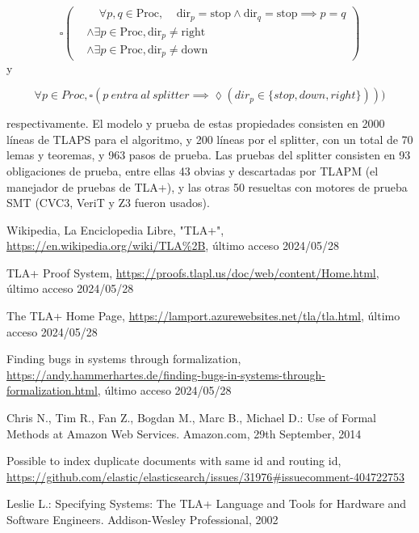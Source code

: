 \documentclass[runningheads]{llncs}
\begin{document}
\[
\square \left( \begin{aligned}
    &\phantom{\land} \forall p,q \in \text{Proc}, \phantom{\land} \text{dir}_p = \text{stop} \land \text{dir}_q = \text{stop} \implies p = q \\
    &\land \exists p \in \text{Proc}, \text{dir}_p \neq \text{right} \\
    &\land \exists p \in \text{Proc}, \text{dir}_p \neq \text{down}
\end{aligned} \right)
\]
y

\[
    \forall p \in Proc, \square(p\ entra\ al\ splitter \implies \lozenge(dir_p \in \{stop, down, right\})))    
\]

respectivamente.
El modelo y prueba de estas propiedades consisten en 2000 líneas de TLAPS para el algoritmo, y 200 líneas por el splitter, con un total de 70 lemas y teoremas, y 963 pasos de prueba. Las pruebas del splitter consisten en 93 obligaciones de prueba, entre ellas 43 obvias y descartadas por TLAPM (el manejador de pruebas de TLA+), y las otras 50 resueltas con motores de prueba SMT (CVC3, VeriT y Z3 fueron usados).


\begin{thebibliography}{8}
Wikipedia, La Enciclopedia Libre, "TLA+", \url{https://en.wikipedia.org/wiki/TLA%2B}, último acceso 2024/05/28

TLA+ Proof System, \url{https://proofs.tlapl.us/doc/web/content/Home.html}, último acceso 2024/05/28

The TLA+ Home Page, \url{https://lamport.azurewebsites.net/tla/tla.html}, último acceso 2024/05/28

Finding bugs in systems through formalization, \url{https://andy.hammerhartes.de/finding-bugs-in-systems-through-formalization.html}, último acceso 2024/05/28

Chris N., Tim R., Fan Z., Bogdan M., Marc B., Michael D.: Use of Formal Methods at Amazon Web Services. Amazon.com, 29th September, 2014

Possible to index duplicate documents with same id and routing id, \url{https://github.com/elastic/elasticsearch/issues/31976#issuecomment-404722753}

Leslie L.: Specifying Systems: The TLA+ Language and Tools for Hardware and Software Engineers. Addison-Wesley Professional, 2002

\end{thebibliography}
\end{document}
